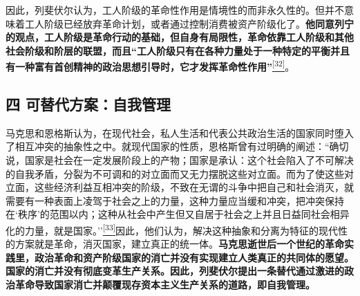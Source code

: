 \documentclass[UTF8, fontset = sourcesans, a4paper, oneside, zihao =
-4, scheme=chinese, no-math, space=true]{ctexbook}
\begin{document}
因此，列斐伏尔认为，工人阶级的革命性作用是情境性的而非永久性的。但并不意味着工人阶级已经放弃革命计划，或者通过控制消费被资产阶级化了。\textbf{他同意列宁的观点，工人阶级是革命行动的基础，但自身有局限性，革命依靠工人阶级和其他社会阶级和阶层的联盟，而且``工人阶级只有在各种力量处于一种特定的平衡并且有一种富有首创精神的政治思想引导时，它才发挥革命性作用''}\protect\hypertarget{part0008_split_002.htmlux5cux23w32}{}{}\protect\hyperlink{part0008_split_003.htmlux5cux23m32}{\textsuperscript{{[}32{]}}}。

\subsection{四
可替代方案：自我管理}\label{part0008_split_002.htmlux5cux23c042}

马克思和恩格斯认为，在现代社会，私人生活和代表公共政治生活的国家同时堕入了相互冲突的抽象性之中。就现代国家的性质，恩格斯曾有过明确的阐述：``确切说，国家是社会在一定发展阶段上的产物；国家是承认：这个社会陷入了不可解决的自我矛盾，分裂为不可调和的对立面而又无力摆脱这些对立面。而为了使这些对立面，这些经济利益互相冲突的阶级，不致在无谓的斗争中把自己和社会消灭，就需要有一种表面上凌驾于社会之上的力量，这种力量应当缓和冲突，把冲突保持在`秩序'的范围以内；这种从社会中产生但又自居于社会之上并且日益同社会相异化的力量，就是国家。''\protect\hypertarget{part0008_split_002.htmlux5cux23w33}{}{}\protect\hyperlink{part0008_split_003.htmlux5cux23m33}{\textsuperscript{{[}33{]}}}因此，他们认为，解决这种抽象和分离为特征的现代性的方案就是革命，消灭国家，建立真正的统一体。\textbf{马克思逝世后一个世纪的革命实践里，政治革命和资产阶级国家的消亡并没有实现建立人类真正的共同体的愿望。国家的消亡并没有彻底变革生产关系。因此，列斐伏尔提出一条替代通过激进的政治革命导致国家消亡并颠覆现存资本主义生产关系的道路，即自我管理。}
\end{document}
